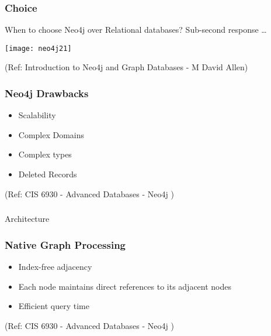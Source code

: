 \begin{frame}[fragile]\frametitle{Choice}
When to choose Neo4j over Relational databases? Sub-second response \ldots


\begin{center}
\texttt{[image: neo4j21]}
\end{center}	    

{\tiny (Ref: Introduction to Neo4j and Graph Databases
 - M David Allen)}

\end{frame}

\begin{frame}\frametitle{Neo4j Drawbacks}


\begin{itemize}
\item  Scalability
\item   Complex Domains
\item   Complex types
\item   Deleted Records
\end{itemize}

 

{\tiny (Ref: CIS 6930 - Advanced Databases - Neo4j )}
\end{frame}

\begin{frame}[fragile]\frametitle{}
\begin{center}
{\Large Architecture}
\end{center}
\end{frame}

\begin{frame}\frametitle{Native Graph Processing}



\begin{itemize}
\item Index-free adjacency
\item Each node maintains direct references to its adjacent nodes
\item Efficient query time
\end{itemize}

{\tiny (Ref: CIS 6930 - Advanced Databases - Neo4j )}
\end{frame}

